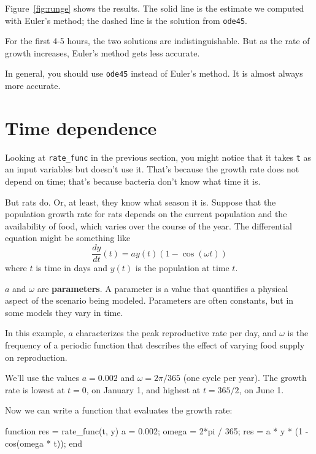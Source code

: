 \documentclass[
]{book}
\numberwithin{Answer}{chapter}
\numberwithin{Exercise}{chapter}
\begin{document}
Figure~\ref{fig:runge} shows the results.  The solid line is the estimate we computed with Euler's method; the dashed line is the solution from {\tt ode45}.

For the first 4-5 hours, the two solutions are indistinguishable.  But as the rate of growth increases, Euler's method gets less accurate.

In general, you should use {\tt ode45} instead of Euler's method.  It is almost always more accurate.  


\section{Time dependence}

Looking at \verb"rate_func" in the previous section, you might notice that it takes {\tt t} as an input variables but doesn't use it.  That's because the growth rate does not depend on time; that's because bacteria don't know what time it is.

But rats do.  Or, at least, they know what season it is.
Suppose that the population growth rate for rats
depends on the current population and the availability of food,
which varies over the course of the year.
The differential equation might be something like
%
\begin{equation}
\frac{dy}{dt}(t) = a y(t) \left(1 - \cos (\omega t) \right)
\end{equation}
%
where $t$ is time in days and $y(t)$ is the population at time $t$.

$a$ and $\omega$ are {\bf parameters}.  A parameter is a value that
quantifies a physical aspect of the scenario being modeled.  Parameters are often constants, but in some models they vary in time.

In this example, $a$ characterizes the peak reproductive rate per day, and
$\omega$ is the frequency of a periodic function that describes
the effect of varying food supply on reproduction.

We'll use the values $a = 0.002$
and $\omega = 2 \pi/365$ (one cycle per year).
The growth rate is lowest at $t=0$, on January 1, and highest at $t=365/2$, on June 1.

Now we can write a function that evaluates the growth rate:

\begin{code}
function res = rate_func(t, y)
    a = 0.002;
    omega = 2*pi / 365;
    res = a * y * (1 - cos(omega * t));
end
\end{code}
\end{document}
